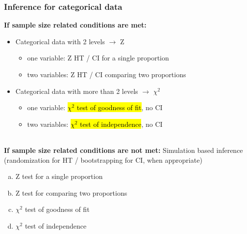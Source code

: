 \documentclass[slidestop,compress,mathserif,12pt,t,professionalfonts,xcolor=table]{beamer}
\newcommand{\solnMult}[1]{#1}
\newcommand{\soln}[1]{}
\begin{document}
\begin{frame}
\frametitle{Inference for categorical data}

\textbf{If sample size related conditions are met:}

\pause

\begin{itemize}

\item Categorical data with 2 levels $\rightarrow$ Z

\pause

\begin{itemize}
\item one variable: Z HT  / CI for a single proportion
\item two variables: Z HT  / CI  comparing two proportions
\end{itemize} 

\pause

\item Categorical data with more than 2 levels $\rightarrow$ $\chi^2$

\pause

\begin{itemize}
\item one variable: \hl{$\chi^2$ test of goodness of fit}, no CI
\item two variables: \hl{$\chi^2$ test of independence}, no CI
\end{itemize} 

\end{itemize}

\pause
$\:$ \\

\textbf{If sample size related conditions are not met:} \pause Simulation based inference (randomization for HT / bootstrapping for CI, when appropriate)

\end{frame}


\begin{frame}


\begin{enumerate}[(a)]
\item Z test for a single proportion
\item Z test for comparing two proportions
\item \solnMult{$\chi^2$ test of goodness of fit}
\item $\chi^2$ test of independence
\end{enumerate}

\pause
$\:$ \\

\soln{\only<2|handout:0>{\red{ $H_0:$ Each outcome is equally likely, $p_1 = p_2 = \cdots = p_{50} = 1/59$ }}}

\end{frame}
\end{document}

